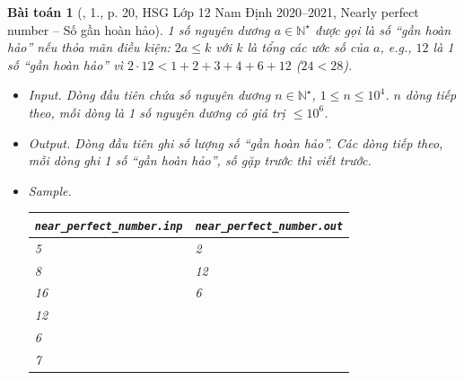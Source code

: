 \documentclass{article}
\newtheorem{baitoan}{Bài toán}
\begin{document}
\begin{baitoan}[\cite{Trung_HSG_THPT_Tin}, 1., p. 20, HSG Lớp 12 Nam Định 2020--2021, Nearly perfect number -- Số gần hoàn hảo]
	1 số nguyên dương $a\in\mathbb{N}^\star$ được gọi là {\rm số ``gần hoàn hảo''} nếu thỏa mãn điều kiện: $2a\le k$ với $k$ là tổng các ước số của $a$, e.g., $12$ là 1 số ``gần hoàn hảo'' vì $2\cdot12 < 1 + 2 + 3 + 4 + 6 + 12$ ($24 < 28$).
	\begin{itemize}
		\item {\sf Input.} Dòng đầu tiên chứa số nguyên dương $n\in\mathbb{N}^\star$, $1\le n\le10^4$. $n$ dòng tiếp theo, mỗi dòng là 1 số nguyên dương có giá trị $\le10^6$.
		\item {\sf Output.} Dòng đầu tiên ghi số lượng số ``gần hoàn hảo''. Các dòng tiếp theo, mỗi dòng ghi 1 số ``gần hoàn hảo'', số gặp trước thì viết trước.
		\item {\sf Sample.}
		\begin{table}[H]
			\centering
			\begin{tabular}{|l|l|}
				\hline
				\verb|near_perfect_number.inp| & \verb|near_perfect_number.out| \\
				\hline
				5 & 2 \\
				8 & 12 \\
				16 & 6 \\
				12 & \\
				6 & \\
				7 & \\
				\hline
			\end{tabular}
		\end{table}
	\end{itemize}
\end{baitoan}
\end{document}
